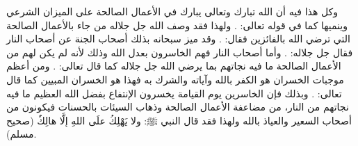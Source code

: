 وكل هذا فيه أن الله تبارك وتعالى يبارك في الأعمال الصالحة على الميزان الشرعي وينميها كما في قوله تعالى: 
\quranayah*[2][261]{\footnotesize \surahname*[2]}. ولهذا فقد وصف الله جل جلاله من جاء بالأعمال الصالحة التي ترضي الله بالفائزين فقال: 
\quranayah*[24][52]{\footnotesize \surahname*[24]}.
 وقد ميز سبحانه بذلك أصحاب الجنة عن أصحاب النار فقال جل جلاله: 
\quranayah*[59][20]{\footnotesize \surahname*[59]}. وأما أصحاب النار فهم الخاسرون بعدل الله وذلك لأنه لم يكن لهم من الأعمال الصالحة ما فيه نجاتهم بما يرضي الله جل جلاله كما قال تعالى: 
\quranayah*[2][27]{\footnotesize \surahname*[2]}. ومن أعظم موجبات الخسران هو الكفر بالله وآياته والشرك به فهذا هو الخسران المبيين كما قال تعالى: 
\quranayah*[39][15]{\footnotesize \surahname*[39]}. وبذلك فإن الخاسرين يوم القيامة يخسرون الإنتفاع بفضل الله العظيم ما فيه نجاتهم من النار، من مضاعفة الأعمال الصالحة وذهاب السيئات بالحسنات فيكونون من أصحاب السعير والعياذ بالله ولهذا فقد قال النبي ﷺ: ولا يَهْلِكُ علَى اللهِ إلَّا هالِكٌ {\footnotesize (صحيح مسلم)}.

